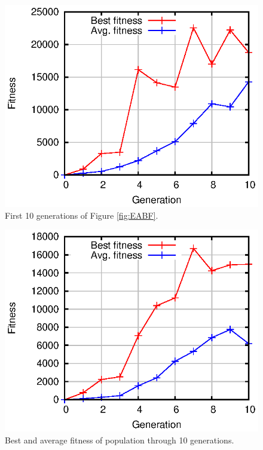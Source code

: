 \documentclass[conference]{IEEEtran}
\begin{document}
\begin{figure}[!htb]
\centering
\includegraphics[scale=.7]{gashort0.eps}
\caption{First 10 generations of Figure \ref{fig:EABF}.}
\label{fig:EASHORTA}
\end{figure}

\begin{figure}[!htb]
\centering
\includegraphics[scale=.7]{gashorta.eps}
\caption{Best and average fitness of population through 10 generations.}
\label{fig:EASHORTA}
\end{figure}
\end{document}
